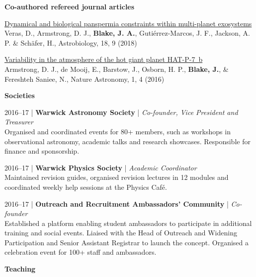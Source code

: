 \documentclass[10pt,a4paper]{altacv}
\begin{document}
\medskip


\normalsize \textbf{Co-authored refereed journal articles} 

\medskip

\small
\href{https://www.liebertpub.com/doi/abs/10.1089/ast.2017.1786}{Dynamical and biological panspermia constraints within multi-planet exosystems} \\
Veras, D., Armstrong, D. J., \textbf{Blake, J. A.}, Guti{\'e}rrez-Marcos, J. F., Jackson, A. P. \& Sch{\"a}fer, H., Astrobiology, 18, 9 (2018)

\smallskip 

\small 
\href{https://www.nature.com/articles/s41550-016-0004}{Variability in the atmosphere of the hot giant planet HAT-P-7~b} \\
Armstrong, D. J., de Mooij, E., Barstow, J., Osborn, H. P., \textbf{Blake, J.}, \& Fereshteh Saniee, N., Nature Astronomy, 1, 4 (2016)

\clearpage


\normalsize \textbf{Societies}

\medskip

\small 2016--17 | \textbf{Warwick Astronomy Society} | \textit{Co-founder, Vice President and Treasurer} \\
Organised and coordinated events for 80+ members, such as workshops in observational astronomy, academic talks and research showcases.
Responsible for finance and sponsorship.

\divider

\small 2016--17 | \textbf{Warwick Physics Society} | \textit{Academic Coordinator} \\
Maintained revision guides, organised revision lectures in 12 modules and coordinated weekly help sessions at the Physics Caf{\'e}.

\divider

\small 2016--17 | \textbf{Outreach and Recruitment Ambassadors' Community} | \textit{Co-founder} \\
Established a platform enabling student ambassadors to participate in additional training and social events.
Liaised with the Head of Outreach and Widening Participation and Senior Assistant Registrar to launch the concept.
Organised a celebration event for 100+ staff and ambassadors.

\medskip

\normalsize \textbf{Teaching}
\end{document}
